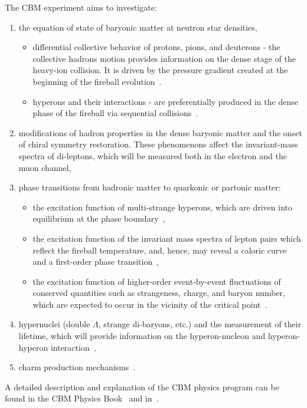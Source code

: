 The \gls{CBM} experiment aims to investigate:
\begin{enumerate}
    \item the equation of state of baryonic matter at neutron star densities,
    \begin{itemize}
        \item differential collective behavior of protons, pions, and deuterons - the collective hadrons motion provides information on the dense stage of the heavy-ion collision. It is driven by the pressure gradient created at the beginning of the fireball evolution~\cite{Reisdorf_2007}.
        \item hyperons and their interactions - are preferentially produced in the dense phase of the fireball via sequential collisions~\cite{CBM_physics}.
    \end{itemize}
    \item modifications of hadron properties in the dense baryonic matter and the onset of chiral symmetry restoration. These phenomenons affect the invariant-mass spectra of di-leptons, which will be measured both in the electron and the muon channel,
    \item phase transitions from hadronic matter to quarkonic or partonic matter:
    \begin{itemize}
        \item the excitation function of multi-strange hyperons, which are driven into equilibrium at the phase boundary~\cite{CBM_physics},
        \item the excitation function of the invariant mass spectra of lepton pairs which reflect the fireball temperature, and, hence, may reveal a caloric curve and a first-order phase transition~\cite{CBM_physics},
        \item the excitation function of higher-order event-by-event fluctuations of conserved quantities such as strangeness, charge, and baryon number, which are expected to occur in the vicinity of the critical point~\cite{CBM_physics}.
    \end{itemize}
    \item hypernuclei (double $\Lambda$, strange di-baryons, etc.) and the measurement of their lifetime, which will provide information on the hyperon-nucleon and hyperon-hyperon interaction~\cite{CBM_physics},
    \item charm production mechanisms~\cite{CBM_physics}.
\end{enumerate}
A detailed description and explanation of the \gls{CBM} physics program can be found in the \gls{CBM} Physics Book~\cite{CBM_physics} and in~\cite{Ablyazimov_2017}.



